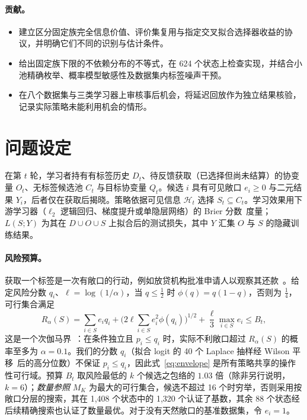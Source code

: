 \documentclass[runningheads]{llncs}
\begin{document}
\paragraph{贡献。}
\begin{itemize}
\item 建立区分固定族完全信息价值、评价集复用与指定交叉拟合选择器收益的协议，并明确它们不同的识别与估计条件。
\item 给出固定族下限的不依赖分布的不等式，在 624 个状态上检查实现，并结合小池精确枚举、概率模型敏感性及数据集内标签噪声干预。
\item 在八个数据集与三类学习器上审核事后机会，将延迟回放作为独立结果核验，记录实际策略未能利用机会的情形。
\end{itemize}



\section{问题设定}
\label{sec:setting}
在第 $t$ 轮，学习者持有有标签历史 $D_t$、待反馈获取（已选择但尚未结算）的协变量 $O_t$、无标签候选池 $C_t$ 与目标协变量 $Q_t$。候选 $i$ 具有可见敞口 $e_i\ge0$ 与二元结果 $Y_i$，后者仅在获取后揭晓。策略依据可见信息 $\mathcal H_t$ 选择 $S_t\subseteq C_t$。学习效果用下游学习器（$\ell_2$ 逻辑回归、梯度提升或单隐层网络）的 Brier 分数~\cite{brier1950verification}度量；$L(S;Y)$ 为其在 $D\cup O\cup S$ 上拟合后的测试损失，其中 $Y$ 汇集 $O$ 与 $S$ 的隐藏训练结果。

\paragraph{风险预算。}获取一个标签是一次有敞口的行动，例如放贷机构批准申请人以观察其还款~\cite{lakkaraju2017selective,wei2021selective}。给定风险分数 $q_i$、$\ell=\log(1/\alpha)$，当 $q\le\frac12$ 时 $\phi(q)=q(1-q)$，否则为 $\frac14$，可行集合满足
\begin{equation}
 R_\alpha(S)=\sum_{i\in S}e_iq_i+\Big(2\ell\sum_{i\in S}e_i^2\phi(q_i)\Big)^{1/2}+\frac{\ell}{3}\max_{i\in S}e_i\le B_t,
 \label{eq:envelope}
\end{equation}
这是一个次伽马界~\cite{boucheron2013concentration}：在条件独立且 $p_i\le q_i$ 时，实际不利敞口超过 $R_\alpha(S)$ 的概率至多为 $\alpha=0.1$。我们的分数 $q_i$（拟合 logit 的 40 个 Laplace 抽样经 Wilson 平移~\cite{wilson1927probable}后的高分位数）不保证 $p_i\le q_i$，因此式~\eqref{eq:envelope} 是所有策略共享的操作性可行域。预算 $B_t$ 取风险最低的 $k$ 个候选之包络的 $1.03$ 倍（除非另行说明，$k=6$）；\emph{数量参照} $M_K$ 为最大的可行集合，候选不超过 16 个时穷举，否则采用按敞口分层的搜索，其在 1{,}408 个状态中的 1{,}320 个认证了基数，其余 88 个状态经后续精确搜索也认证了数量最优。对于没有天然敞口的基准数据集，令 $e_i=1$。
\end{document}
